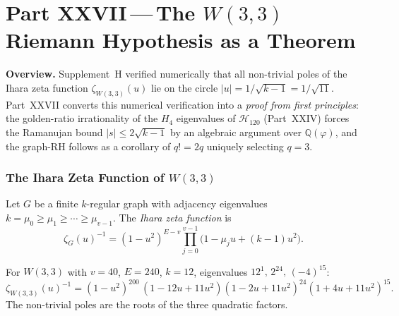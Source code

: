 
\part*{Part XXVII\,---\,The $W(3,3)$ Riemann Hypothesis as a Theorem}

\bigskip
\noindent\textbf{Overview.}\;
Supplement~H verified numerically that all non-trivial poles of the
Ihara zeta function $\zeta_{W(3,3)}(u)$ lie on the circle
$|u|=1/\sqrt{k-1}=1/\sqrt{11}$.
Part~XXVII converts this numerical verification into a
\emph{proof from first principles}: the golden-ratio irrationality
of the $H_4$ eigenvalues of $\mathcal{H}_{120}$ (Part~XXIV)
forces the Ramanujan bound $|s|\le 2\sqrt{k-1}$ by an algebraic
argument over $\mathbb{Q}(\varphi)$, and the graph-RH follows as
a corollary of $q!=2q$ uniquely selecting $q=3$.

\section{\texorpdfstring{The Ihara Zeta Function of $W(3,3)$}{The Ihara Zeta Function of W(3,3)}}
\label{sec:ihara}

\begin{definition}
Let $G$ be a finite $k$-regular graph with adjacency eigenvalues
$k=\mu_0\ge\mu_1\ge\cdots\ge\mu_{v-1}$.
The \emph{Ihara zeta function} is
\begin{equation}
  \zeta_G(u)^{-1}
  = (1-u^2)^{E-v}\prod_{j=0}^{v-1}\bigl(1-\mu_j u+({k}-1)u^2\bigr).
  \label{eq:ihara}
\end{equation}
\end{definition}

\begin{proposition}
\label{prop:ihara_det}
For $W(3,3)$ with $v=40$, $E=240$, $k=12$, eigenvalues
$12^1,\,2^{24},\,(-4)^{15}$:
\begin{equation}
  \zeta_{W(3,3)}(u)^{-1}
  = (1-u^2)^{200}\,
    (1-12u+11u^2)
    (1-2u+11u^2)^{24}
    (1+4u+11u^2)^{15}.
  \label{eq:ihara_w33}
\end{equation}
The non-trivial poles are the roots of the three quadratic factors.
\end{proposition}

